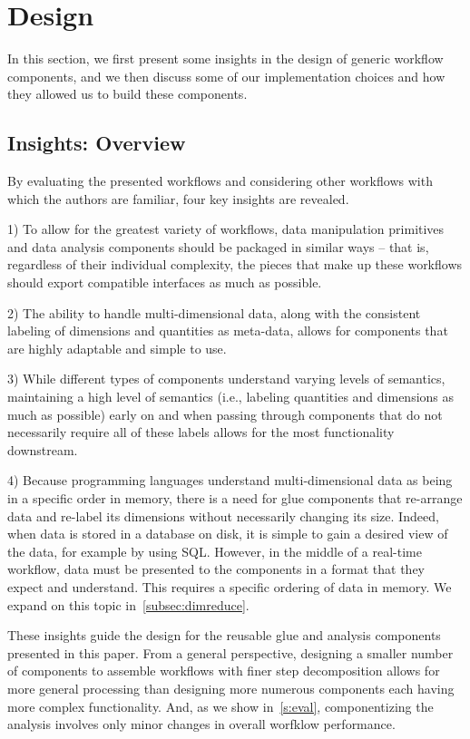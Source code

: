 \section{Design}
\label{s:design}

In this section, we first present
some insights in the design of
generic workflow components,
and we then discuss
some of our implementation choices
and how they allowed us to 
build these components.

\subsection{Insights: Overview}

By evaluating the presented workflows
and considering other workflows with
which the authors are familiar,
four key insights are revealed.

1) To allow for the greatest variety of workflows,
data manipulation primitives and data analysis components
should be packaged in similar ways -- that is,
regardless of their individual complexity,
the pieces that make up these workflows
should export compatible interfaces as much as possible.

2) The ability to handle multi-dimensional data,
along with the consistent labeling of
dimensions and quantities as meta-data,
allows for components that are highly
adaptable and simple to use.

3) While different types of components understand
varying levels of semantics, maintaining a
high level of semantics (i.e., labeling
quantities and dimensions as much
as possible) early on and when passing
through components that do not necessarily
require all of these labels allows for the most
functionality downstream.

4) Because programming languages understand
multi-dimensional data as being in a
specific order in memory, there is a need for
glue components that re-arrange data and
re-label its dimensions without necessarily
changing its size. Indeed, when data is stored
in a database on disk, it is simple to gain a desired
view of the data, for example by using SQL.
However, in the middle of a real-time workflow,
data must be presented to the components in a
format that they expect and understand.
This requires a specific ordering of data in
memory. We expand on this topic in~\autoref{subsec:dimreduce}.

These insights guide the design for the
reusable glue and analysis
components presented in this
paper. From a general perspective, designing a smaller number of
components to assemble workflows with finer step decomposition
allows for more general processing
than designing more numerous components each having more
complex functionality.
And, as we show in~\autoref{s:eval}, componentizing
the analysis involves only minor changes
in overall worfklow performance.


